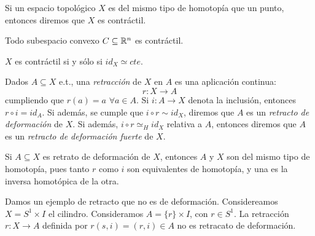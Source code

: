 \documentclass[HS.tex]{subfiles}
\begin{document}
\begin{defi}
Si un espacio topológico $X$ es del mismo tipo de homotopía que un punto, entonces diremos que $X$ es contráctil.
\end{defi}
\begin{ej}
Todo subespacio convexo $C \subseteq \mathbb{R}^n$ es contráctil.
\end{ej}
\begin{prop}
$X$ es contráctil si y sólo si $id_X \simeq cte$.
\end{prop}

\begin{defi}
Dados $A \subseteq X$ e.t., una \emph{retracción} de $X$ en $A$ es una aplicación continua:
\[ r \colon X \to A \]
cumpliendo que $r(a) = a$ $\forall a \in A$.
Si $i \colon A \to X$ denota la inclusión, entonces $r \circ i = id_A$.
Si además, se cumple que $i \circ r \sim id_X$, diremos que $A$ es un \emph{retracto de deformación} de $X$.
Si además, $i \circ r \simeq_H id_X$ relativa a $A$, entonces diremos que $A$ es un \emph{retracto de deformación fuerte} de $X$.
\end{defi}

\begin{nota}
Si $A \subseteq X$ es retrato de deformación de $X$, entonces $A$ y $X$ son del mismo tipo de homotopía, pues tanto $r$ como $i$ son equivalentes de homotopía, y una es la inversa homotópica de la otra.
\end{nota}
\begin{ej}
Damos un ejemplo de retracto que no es de deformación.
Considereamos $X = S^1 \times I$ el cilindro. Consideramos $A = \{r\} \times I$, con $r \in S^1$.
La retracción $r \colon X \to A$ definida por $r(s,i) = (r,i) \in A$ no es retracato de deformación. 
\end{ej}
\end{document}
